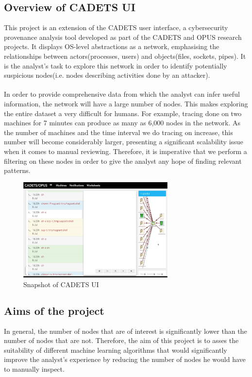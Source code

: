 	\subsection{Overview of CADETS UI}\label{1.1.1}
	This project is an extension of the CADETS user interface, a cybersecurity provenance analysis tool developed as part of the CADETS and OPUS research projects. It displays OS-level abstractions as a network, emphasising the relationships between actors(processes, users) and objects(files, sockets, pipes). It is the analyst's task to explore this network in order to identify potentially suspicious nodes(i.e. nodes describing activities done by an attacker). 
	\\ \\
	In order to provide comprehensive data from which the analyst can infer useful information, the network will have a large number of nodes. This makes exploring the entire dataset a very difficult for humans.  For example, tracing done on two machines for 7 minutes can produce as many as 6,000 nodes in the network. As the number of machines and the time interval we do tracing on increase, this number will become considerably larger, presenting a significant scalability issue when it comes to manual reviewing. Therefore, it is imperative that we perform a filtering on these nodes in order to give the analyst any hope of finding relevant patterns.
	\begin{figure}[H]
		\centering
		\includegraphics[width=0.7\textwidth]{graphics/CADETS}
		\caption{Snapshot of CADETS UI}
		\label{Figure 1.1}
	\end{figure}
	
	\subsection{Aims of the project}
	In general, the number of nodes that are of interest is significantly lower than the number of nodes that are not. Therefore, the aim of this project is to asses the suitability of different machine learning algorithms that would significantly improve the analyst's experience by reducing the number of nodes he would have to manually inspect. 
	
